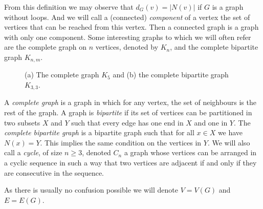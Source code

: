 From this definition we may observe that $d_G(v) = |N(v)|$ if $G$ is a graph without loops. 
And we will call a (connected) \emph{component} of a vertex the set of vertices that can be reached from this vertex. 
Then a connected graph is a graph with only one component.
\newline
Some interesting graphs to which we will often refer are the complete graph on $n$ vertices, denoted by $K_n$, and the complete bipartite graph $K_{n,m}$. 
\begin{figure}
	\caption{ (a) The complete graph $K_5$ and (b) the complete bipartite graph $K_{3,3}$.}
\end{figure}
A \emph{complete graph} is a graph in which for any vertex, the set of neighbours is the rest of the graph. 
A graph is \emph{bipartite} if its set of vertices can be partitioned in two subsets $X$ and $Y$ such that every edge has one end in $X$ and one in $Y$. 
The \emph{complete bipartite graph} is a bipartite graph such that for all $x \in X$ we have $N(x) = Y$. 
This implies the same condition on the vertices in $Y$.
We will also call a \emph{cycle}, of size $n \geq 3$, denoted $C_n$ a graph whose vertices can be arranged in a cyclic sequence in such a way that two vertices are adjacent if and only if they are consecutive in the sequence.

As there is usually no confusion possible we will denote $V = V(G)$ and $E =E(G)$. 


